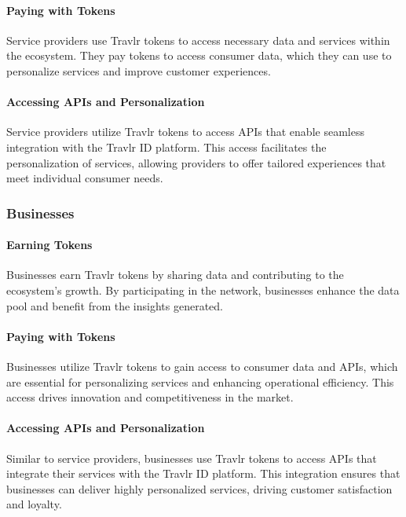 \documentclass{article}
\begin{document}
\paragraph{Paying with Tokens}

Service providers use Travlr tokens to access necessary data and services within the ecosystem. They pay tokens to access consumer data, which they can use to personalize services and improve customer experiences.

\paragraph{Accessing APIs and Personalization}

Service providers utilize Travlr tokens to access APIs that enable seamless integration with the Travlr ID platform. This access facilitates the personalization of services, allowing providers to offer tailored experiences that meet individual consumer needs.

\subsubsection{Businesses}

\paragraph{Earning Tokens}

Businesses earn Travlr tokens by sharing data and contributing to the ecosystem's growth. By participating in the network, businesses enhance the data pool and benefit from the insights generated.

\paragraph{Paying with Tokens}

Businesses utilize Travlr tokens to gain access to consumer data and APIs, which are essential for personalizing services and enhancing operational efficiency. This access drives innovation and competitiveness in the market.

\paragraph{Accessing APIs and Personalization}

Similar to service providers, businesses use Travlr tokens to access APIs that integrate their services with the Travlr ID platform. This integration ensures that businesses can deliver highly personalized services, driving customer satisfaction and loyalty.
\end{document}
